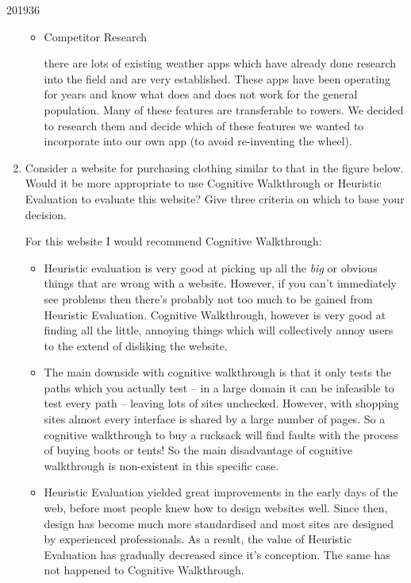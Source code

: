 \documentclass[10pt,\jkfside,a4paper]{article}
\begin{document}
\begin{examquestion}{2019}{3}{6}
\begin{enumerate}[label=(\alph*)]
\begin{itemize}
\item Competitor Research

there are lots of existing weather apps which have already done research into the
field and are very established. These apps have been operating for years and know
what does and does not work for the general population. Many of these features are
transferable to rowers. We decided to research them and decide which of these features
we wanted to incorporate into our own app (to avoid re-inventing the wheel).

\end{itemize}

\item Consider a website for purchasing clothing similar to that in the figure below.
Would it be more appropriate to use Cognitive Walkthrough or Heuristic
Evaluation to evaluate this website? Give three criteria on which to base your
decision.

For this website I would recommend Cognitive Walkthrough:

\begin{itemize}

\item Heuristic evaluation is very good at picking up all the \textit{big}
or obvious things that are wrong with a website. However, if you can't immediately
see problems then there's probably not too much to be gained from Heuristic Evaluation.
Cognitive Walkthrough, however is very good at finding all the little, annoying things
which will collectively annoy users to the extend of disliking the website.

\item The main downside with cognitive walkthrough is that it only tests the
paths which you actually test -- in a large domain it can be infeasible to test
every path -- leaving lots of sites unchecked. However, with shopping sites
almost every interface is shared by a large number of pages. So a cognitive
walkthrough to buy a rucksack will find faults with the process of buying
boots or tents! So the main disadvantage of cognitive walkthrough is non-existent
in this specific case.

\item Heuristic Evaluation yielded great improvements in the early days of
the web, before most people knew how to design websites well. Since then,
design has become much more standardised and most sites are designed by
experienced professionals. As a result, the value of Heuristic Evaluation
has gradually decreased since it's conception. The same has not happened to
Cognitive Walkthrough.


\end{itemize}
\end{enumerate}
\end{examquestion}
\end{document}
